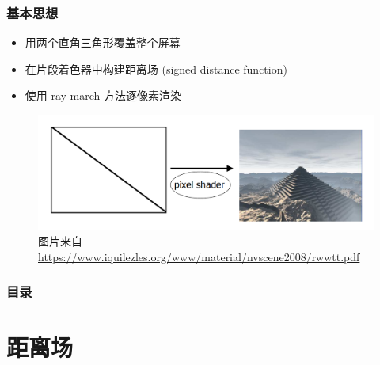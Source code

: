 \documentclass[aspectratio=169]{ctexbeamer} %
\begin{document}
\begin{frame}
    \frametitle{基本思想}
    \begin{itemize}
        \item 用两个直角三角形覆盖整个屏幕
        \item 在片段着色器中构建距离场 (signed distance function) %
        \item 使用 ray march 方法逐像素渲染 %
    \end{itemize}
    \begin{figure}[htbp]
        \centering
        \includegraphics[height=.5\textheight]{images/pre/iq_2tri.pdf}
        \caption{\footnotesize 图片来自 \url{https://www.iquilezles.org/www/material/nvscene2008/rwwtt.pdf}}
        \label{fig:iq_2tri}
    \end{figure}
\end{frame}

\begin{frame}
    \frametitle{目录}
    \tableofcontents
\end{frame}

\section{距离场}
\end{document}
